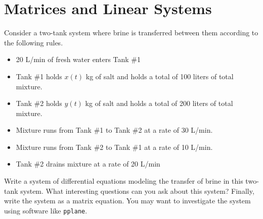 \newpage\section{Matrices and Linear Systems}

\begin{problem}
    Consider a two-tank system where brine is transferred between them according to the
    following rules.
    \begin{itemize}
        \item 20 L/min of fresh water enters Tank \#1
        \item Tank \#1 holds $x(t)$ kg of salt and holds a total of 100 liters of total
            mixture.
        \item Tank \#2 holds $y(t)$ kg of salt and holds a total of 200 liters of total
            mixture.
        \item Mixture runs from Tank \#1 to Tank \#2 at a rate of 30 L/min.
        \item Mixture runs from Tank \#2 to Tank \#1 at a rate of 10 L/min.
        \item Tank \#2 drains mixture at a rate of 20 L/min
    \end{itemize}
    Write a system of differential equations modeling the transfer of brine in this
    two-tank system.  What interesting questions can you ask about this system?  Finally,
    write the system as a matrix equation. You may want to investigate the system using
    software like \texttt{pplane}.
\end{problem}



